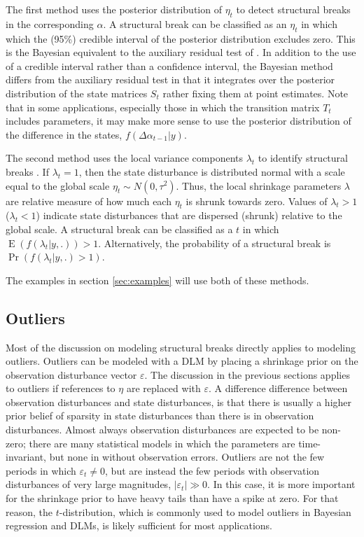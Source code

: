 \documentclass{article}
\DeclareMathOperator{\E}{E}
\begin{document}
The first method uses the posterior distribution of $\eta_{t}$ to detect structural breaks in the corresponding $\alpha$.
A structural break can be classified as an $\eta_{t}$ in which which the (95\%) credible interval of the posterior distribution excludes zero.
This is the Bayesian equivalent to the auxiliary residual test of \textcites{JongPenzer1998}{DurbinKoopman2001}.%
In addition to the use of a credible interval rather than a confidence interval, the Bayesian method differs from the auxiliary residual test in that it integrates over the posterior distribution of the state matrices $S_{t}$ rather fixing them at point estimates.
Note that in some applications, especially those in which the transition matrix $T_{t}$ includes parameters, it may make more sense to use the posterior distribution of the difference in the states, $f(\Delta \alpha_{t - 1} | y)$.

The second method uses the local variance components $\lambda_{t}$ to identify structural breaks \parencite[179-180]{PetrisPetroneEtAl2009}.
If $\lambda_{t} = 1$, then the state disturbance is distributed normal with a scale equal to the global scale $\eta_{t} \sim N(0, \tau^{2})$.
Thus, the local shrinkage parameters $\lambda$ are relative measure of how much each $\eta_{t}$ is shrunk towards zero.
Values of $\lambda_{t} > 1$ ($\lambda_{t} < 1$) indicate state disturbances that are dispersed (shrunk) relative to the global scale.
A structural break can be classified as a $t$ in which $\E (f(\lambda_{t} | y, .)) > 1$.
Alternatively, the probability of a structural break is $\Pr(f(\lambda_{t} | y, .) > 1)$.

The examples in section \ref{sec:examples} will use both of these methods.

\subsection{Outliers}
\label{sec:outliers}

Most of the discussion on modeling structural breaks directly applies to modeling outliers.
Outliers can be modeled with a DLM by placing a shrinkage prior on the observation disturbance vector $\varepsilon$. 
The discussion in the previous sections applies to outliers if references to $\eta$ are replaced with $\varepsilon$.
A difference difference between observation disturbances and state disturbances, is that there is usually a higher prior belief of sparsity in state disturbances than there is in observation disturbances. 
Almost always observation disturbances are expected to be non-zero; 
there are many statistical models in which the parameters are time-invariant, but none in without observation errors.%
Outliers are not the few periods in which $\varepsilon_{t} \neq 0$, but are instead the few periods with observation disturbances of very large magnitudes, $|\varepsilon_{t}| \gg 0$.
In this case, it is more important for the shrinkage prior to have heavy tails than have a spike at zero.
For that reason, the $t$-distribution, which is commonly used to model outliers in Bayesian regression and DLMs, is likely sufficient for most applications.
\end{document}
